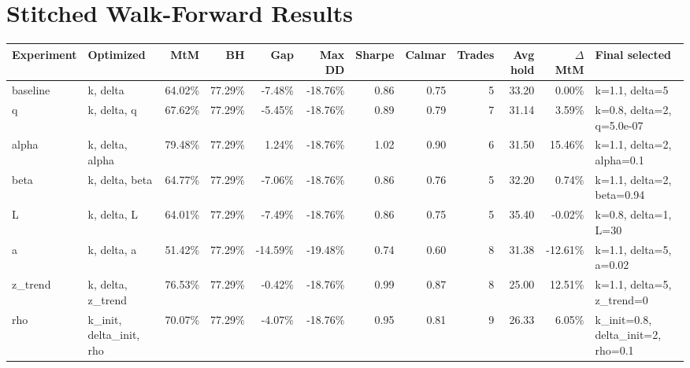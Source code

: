 \documentclass[10pt]{article}
\begin{document}
\section*{Stitched Walk-Forward Results}
\scriptsize
\setlength{\tabcolsep}{3pt}
\begin{tabular}{p{0.9in}p{1.1in}rrrrrrrrrp{1.25in}}
\toprule
Experiment & Optimized & MtM & BH & Gap & Max DD & Sharpe & Calmar & Trades & Avg hold & $\Delta$ MtM & Final selected \\
\midrule
baseline & k, delta & 64.02\% & 77.29\% & -7.48\% & -18.76\% & 0.86 & 0.75 & 5 & 33.20 & 0.00\% & k=1.1, delta=5 \\
q & k, delta, q & 67.62\% & 77.29\% & -5.45\% & -18.76\% & 0.89 & 0.79 & 7 & 31.14 & 3.59\% & k=0.8, delta=2, q=5.0e-07 \\
alpha & k, delta, alpha & 79.48\% & 77.29\% & 1.24\% & -18.76\% & 1.02 & 0.90 & 6 & 31.50 & 15.46\% & k=1.1, delta=2, alpha=0.1 \\
beta & k, delta, beta & 64.77\% & 77.29\% & -7.06\% & -18.76\% & 0.86 & 0.76 & 5 & 32.20 & 0.74\% & k=1.1, delta=2, beta=0.94 \\
L & k, delta, L & 64.01\% & 77.29\% & -7.49\% & -18.76\% & 0.86 & 0.75 & 5 & 35.40 & -0.02\% & k=0.8, delta=1, L=30 \\
a & k, delta, a & 51.42\% & 77.29\% & -14.59\% & -19.48\% & 0.74 & 0.60 & 8 & 31.38 & -12.61\% & k=1.1, delta=5, a=0.02 \\
z\_trend & k, delta, z\_trend & 76.53\% & 77.29\% & -0.42\% & -18.76\% & 0.99 & 0.87 & 8 & 25.00 & 12.51\% & k=1.1, delta=5, z\_trend=0 \\
rho & k\_init, delta\_init, rho & 70.07\% & 77.29\% & -4.07\% & -18.76\% & 0.95 & 0.81 & 9 & 26.33 & 6.05\% & k\_init=0.8, delta\_init=2, rho=0.1 \\
\bottomrule
\end{tabular}
\normalsize
\end{document}
